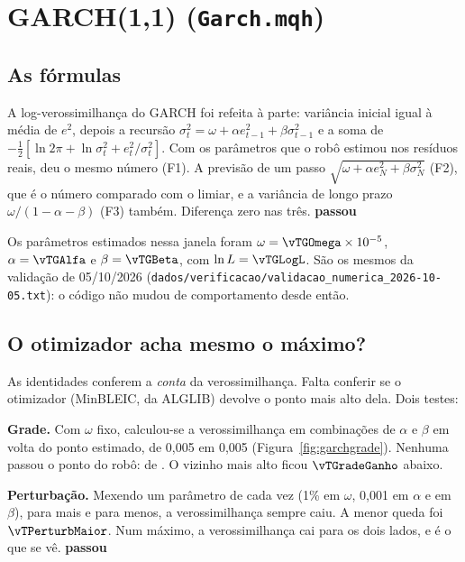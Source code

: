 \documentclass[11pt,a4paper]{article}
\newcommand{\ok}{\textcolor{cok}{\textbf{passou}}}
\begin{document}
\section{GARCH(1,1) (\texttt{Garch.mqh})}\label{sec:garch}

\subsection{As fórmulas}

A log-verossimilhança do GARCH foi refeita à parte: variância inicial igual à média de $e^2$, depois a recursão
$\sigma^2_t = \omega + \alpha e^2_{t-1} + \beta \sigma^2_{t-1}$ e a soma de
$-\tfrac12[\ln 2\pi + \ln\sigma^2_t + e^2_t/\sigma^2_t]$. Com os parâmetros que o robô estimou nos resíduos reais,
deu o mesmo número (F1). A previsão de um passo $\sqrt{\omega + \alpha e_N^2 + \beta\sigma_N^2}$ (F2), que é o
número comparado com o limiar, e a variância de longo prazo $\omega/(1-\alpha-\beta)$ (F3) também. Diferença
zero nas três. \ok

Os parâmetros estimados nessa janela foram $\omega = \vTGOmega\times10^{-5}$, $\alpha = \vTGAlfa$ e
$\beta = \vTGBeta$, com $\ln L = \vTGLogL$. São os mesmos da validação de 05/10/2026
(\nolinkurl{dados/verificacao/validacao_numerica_2026-10-05.txt}): o código não mudou de comportamento desde então.

\subsection{O otimizador acha mesmo o máximo?}

As identidades conferem a \emph{conta} da verossimilhança. Falta conferir se o otimizador (MinBLEIC, da ALGLIB)
devolve o ponto mais alto dela. Dois testes:

\textbf{Grade.} Com $\omega$ fixo, calculou-se a verossimilhança em \vTGradeViaveis{} combinações de $\alpha$ e
$\beta$ em volta do ponto estimado, de 0,005 em 0,005 (Figura~\ref{fig:garchgrade}). Nenhuma passou o ponto do
robô: \vTGradeMelhores{} de \vTGradeViaveis. O vizinho mais alto ficou $\vTGradeGanho$ abaixo.

\textbf{Perturbação.} Mexendo um parâmetro de cada vez (1\% em $\omega$, 0,001 em $\alpha$ e em $\beta$), para
mais e para menos, a verossimilhança sempre caiu. A menor queda foi $\vTPerturbMaior$. Num máximo, a
verossimilhança cai para os dois lados, e é o que se vê. \ok
\end{document}
